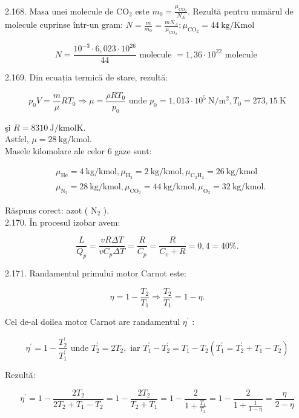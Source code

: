 2.168. Masa unei molecule de $\mathrm{CO}_{2}$ este $m_{0}=\frac{\mu_{\mathrm{CO}_{2}}}{N_{A}}$. Rezultă pentru numărul de molecule cuprinse într-un gram: $N=\frac{m}{m_{0}}=\frac{m N_{A}}{\mu_{\mathrm{CO}_{2}}} ; \mu_{\mathrm{CO}_{2}}=44 \mathrm{~kg} / \mathrm{Kmol}$

$$
N=\frac{10^{-3} \cdot 6,023 \cdot 10^{26}}{44} \text { molecule }=1,36 \cdot 10^{22} \text { molecule }
$$

2.169. Din ecuația termică de stare, rezultă:

$$
p_{0} V=\frac{m}{\mu} R T_{0} \Rightarrow \mu=\frac{\rho R T_{0}}{p_{0}} \text { unde } p_{0}=1,013 \cdot 10^{5} \mathrm{~N} / \mathrm{m}^{2}, T_{0}=273,15 \mathrm{~K}
$$

şi $R=8310 \mathrm{~J} / \mathrm{kmolK}$.\\
Astfel, $\mu=28 \mathrm{~kg} / \mathrm{kmol}$.\\
Masele kilomolare ale celor 6 gaze sunt:

$$
\begin{aligned}
& \mu_{\mathrm{He}}=4 \mathrm{~kg} / \mathrm{kmol}, \mu_{\mathrm{H}_{2}}=2 \mathrm{~kg} / \mathrm{kmol}, \mu_{\mathrm{C}_{2} \mathrm{H}_{2}}=26 \mathrm{~kg} / \mathrm{kmol} \\
& \mu_{\mathrm{N}_{2}}=28 \mathrm{~kg} / \mathrm{kmol}, \mu_{\mathrm{CO}_{2}}=44 \mathrm{~kg} / \mathrm{kmol}, \mu_{\mathrm{O}_{2}}=32 \mathrm{~kg} / \mathrm{kmol} .
\end{aligned}
$$

Răspuns corect: azot ( $\mathrm{N}_{2}$ ).\\
2.170. În procesul izobar avem:

$$
\frac{L}{Q_{p}}=\frac{v R \Delta T}{v C_{p} \Delta T}=\frac{R}{C_{p}}=\frac{R}{C_{v}+R}=0,4=40 \% .
$$

2.171. Randamentul primului motor Carnot este:

$$
\eta=1-\frac{T_{2}}{T_{1}} \Rightarrow \frac{T_{2}}{T_{1}}=1-\eta .
$$

Cel de-al doilea motor Carnot are randamentul $\eta^{\prime}$ :

$$
\eta^{\prime}=1-\frac{T_{2}^{\prime}}{T_{1}^{\prime}} \text { unde } T_{2}^{\prime}=2 T_{2}, \text { iar } T_{1}^{\prime}-T_{2}^{\prime}=T_{1}-T_{2}\left(T_{1}^{\prime}=T_{2}^{\prime}+T_{1}-T_{2}\right)
$$

Rezultă:

$$
\eta^{\prime}=1-\frac{2 T_{2}}{2 T_{2}+T_{1}-T_{2}}=1-\frac{2 T_{2}}{T_{2}+T_{1}}=1-\frac{2}{1+\frac{T_{1}}{T_{2}}}=1-\frac{2}{1+\frac{1}{1-\eta}}=\frac{\eta}{2-\eta}
$$

